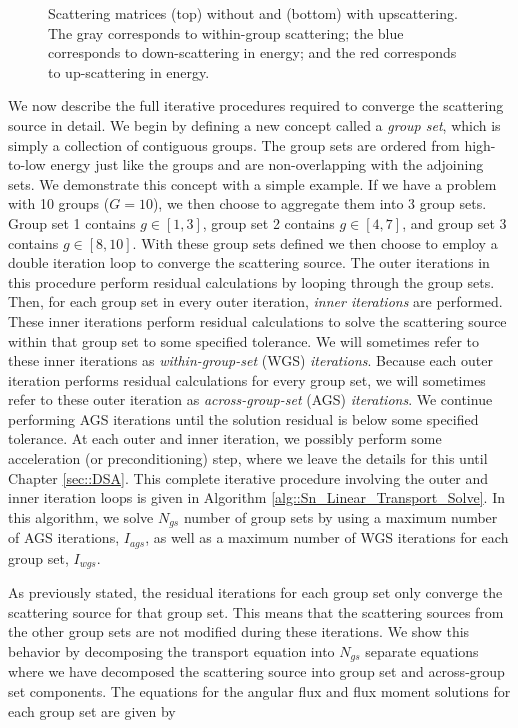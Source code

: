 \begin{figure}
\begin{subfigure}[b]{0.58\textwidth}
	\end{subfigure}
\caption{Scattering matrices (top) without and (bottom) with upscattering. The gray corresponds to within-group scattering; the blue corresponds to down-scattering in energy; and the red corresponds to up-scattering in energy.}
\label{fig::Sn_Solution_Iterative_scattmatrix}
\end{figure}

We now describe the full iterative procedures required to converge the scattering source in detail. We begin by defining a new concept called a {\em group set}, which is simply a collection of contiguous groups. The group sets are ordered from high-to-low energy just like the groups and are non-overlapping with the adjoining sets. We demonstrate this concept with a simple example. If we have a problem with 10 groups ($G=10$), we then choose to aggregate them into 3 group sets. Group set 1 contains $g \in [1,3]$, group set 2 contains $g \in [4,7]$, and group set 3 contains $g \in [8,10]$. With these group sets defined we then choose to employ a double iteration loop to converge the scattering source. The outer iterations in this procedure perform residual calculations by looping through the group sets. Then, for each group set in every outer iteration, {\em inner iterations} are performed. These inner iterations perform residual calculations to solve the scattering source within that group set to some specified tolerance. We will sometimes refer to these inner iterations as {\em within-group-set} (WGS) {\em iterations}. Because each outer iteration performs residual calculations for every group set, we will sometimes refer to these outer iteration as {\em across-group-set} (AGS) {\em iterations}. We continue performing AGS iterations until the solution residual is below some specified tolerance. At each outer and inner iteration, we possibly perform some acceleration (or preconditioning) step, where we leave the details for this until Chapter \ref{sec::DSA}. This complete iterative procedure involving the outer and inner iteration loops is given in Algorithm \ref{alg::Sn_Linear_Transport_Solve}. In this algorithm, we solve $N_{gs}$ number of group sets by using a maximum number of AGS iterations, $I_{ags}$, as well as a maximum number of WGS iterations for each group set, $I_{wgs}$.

As previously stated, the residual iterations for each group set only converge the scattering source for that group set. This means that the scattering sources from the other group sets are not modified during these iterations. We show this behavior by decomposing the transport equation into $N_{gs}$ separate equations where we have decomposed the scattering source into group set and across-group set components. The equations for the angular flux and flux moment solutions for each group set are given by

